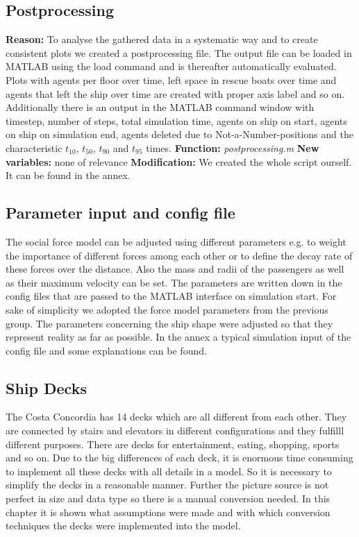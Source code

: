 \documentclass[11pt]{article}
\begin{document}
\subsection{Postprocessing}
\textbf{Reason:}
\newline
To analyse the gathered data in a systematic way and to create consistent plots we created a postprocessing file. The output file can be loaded in MATLAB using the load command and is thereafter automatically evaluated. Plots with agents per floor over time, left space in rescue boats over time and agents that left the ship over time are created with proper axis label and so on. Additionally there is an output in the MATLAB command window with timestep, number of steps, total simulation time, agents on ship on start, agents on ship on simulation end, agents deleted due to Not-a-Number-positions and the characteristic $t_10$, $t_50$, $t_90$ and $t_95$ times.
\newline
\textbf{Function:}
\newline
\textit{postprocessing.m}
\newline
\textbf{New variables:}
\newline
none of relevance
\newline
\textbf{Modification:}
\newline
We created the whole script ourself. It can be found in the annex.
\subsection{Parameter input and config file}
The social force model can be adjusted using different parameters e.g. to weight the importance of different forces among each other or to define the decay rate of these forces over the distance. Also the mass and radii of the passengers as well as their maximum velocity can be set. The parameters are written down in the config files that are passed to the MATLAB interface on simulation start. For sake of simplicity we adopted the force model parameters from the previous group. The parameters concerning the ship shape were adjusted so that they represent reality as far as possible.
\newline
In the annex a typical simulation input of the config file and some explanations can be found.

\subsection{Ship Decks}

The Costa Concordia has 14 decks which are all different from each other. They are connected by stairs and elevators in different configurations and they fulfilll different purposes. There are decks for entertainment, eating, shopping, sports and so on.
Due to the big differences of each deck, it is enormous time consuming to implement all these decks with all details in a model. So it is necessary to simplify the decks in a reasonable manner.
Further the picture source is not perfect in size and data type so there is a manual conversion needed.
In this chapter it is shown what assumptions were made and with which conversion techniques the decks were implemented into the model.
\end{document}
